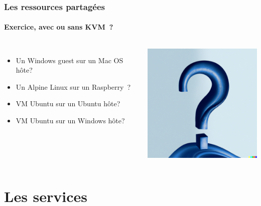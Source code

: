\documentclass{beamer}
\begin{document}
    \begin{frame}
        \transdissolve
        \frametitle{Les ressources partagées}
        \framesubtitle{Exercice, avec ou sans KVM~?}
        \begin{columns}
            \begin{itemize}
                \item Un Windows guest sur un Mac OS hôte?
                \item Un Alpine Linux sur un Raspberry\footnotemark~?
                \item VM Ubuntu sur un Ubuntu hôte?
                \item VM Ubuntu sur un Windows hôte?
            \end{itemize}
            \centering
            \includegraphics[width=6cm]{image/question-mark-on-a-blank-background.png}
        \end{columns}
    \end{frame}


    \section{Les services}\label{sec:les-services}
\end{document}

